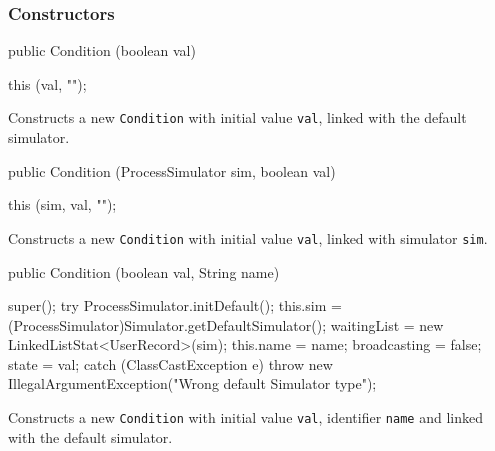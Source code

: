 \subsubsection* {Constructors}
\begin{code}

   public Condition (boolean val) \begin{hide} {
      this (val, "");
   }\end{hide}
\end{code}
 \begin{tabb}  Constructs a new \texttt{Condition} with initial value \texttt{val}, linked with the default simulator.
 \end{tabb}
\begin{htmlonly}
\end{htmlonly}
\begin{code}

   public Condition (ProcessSimulator sim, boolean val) \begin{hide} {
      this (sim, val, "");
   }\end{hide}
\end{code}
 \begin{tabb}  Constructs a new \texttt{Condition} with initial value \texttt{val}, linked with simulator \texttt{sim}.
 \end{tabb}
\begin{htmlonly}
\end{htmlonly}
\begin{code}

   public Condition (boolean val, String name) \begin{hide} {
      super();
      try {
         ProcessSimulator.initDefault();
         this.sim = (ProcessSimulator)Simulator.getDefaultSimulator();
         waitingList = new LinkedListStat<UserRecord>(sim);
         this.name = name;
         broadcasting = false;
         state = val;
      }
      catch (ClassCastException e) {
         throw new IllegalArgumentException("Wrong default Simulator type");
      }
   }\end{hide}
\end{code}
\begin{tabb}  Constructs a new \texttt{Condition} with initial value \texttt{val}, 
 identifier \texttt{name} and linked with the default simulator.
\end{tabb}
\begin{htmlonly}
\end{htmlonly}
